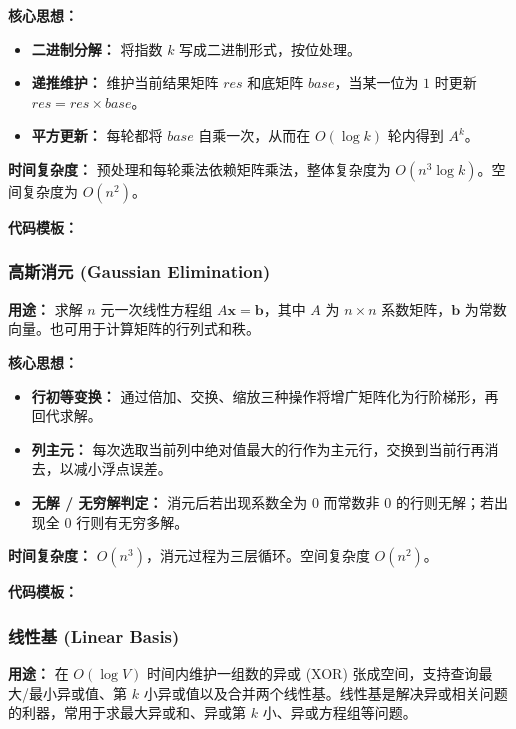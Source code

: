 \textbf{核心思想：}
\begin{itemize}
    \item \textbf{二进制分解：} 将指数 $k$ 写成二进制形式，按位处理。
    \item \textbf{递推维护：} 维护当前结果矩阵 $res$ 和底矩阵 $base$，当某一位为 $1$ 时更新 $res = res \times base$。
    \item \textbf{平方更新：} 每轮都将 $base$ 自乘一次，从而在 $O(\log k)$ 轮内得到 $A^k$。
\end{itemize}

\textbf{时间复杂度：} 预处理和每轮乘法依赖矩阵乘法，整体复杂度为 $O(n^3 \log k)$。空间复杂度为 $O(n^2)$。

\textbf{代码模板：}



\subsubsection{高斯消元 (Gaussian Elimination)}

\textbf{用途：}
求解 $n$ 元一次线性方程组 $A \boldsymbol{x} = \boldsymbol{b}$，其中 $A$ 为 $n \times n$ 系数矩阵，$\boldsymbol{b}$ 为常数向量。也可用于计算矩阵的行列式和秩。

\textbf{核心思想：}
\begin{itemize}
    \item \textbf{行初等变换：} 通过倍加、交换、缩放三种操作将增广矩阵化为行阶梯形，再回代求解。
    \item \textbf{列主元：} 每次选取当前列中绝对值最大的行作为主元行，交换到当前行再消去，以减小浮点误差。
    \item \textbf{无解 / 无穷解判定：} 消元后若出现系数全为 $0$ 而常数非 $0$ 的行则无解；若出现全 $0$ 行则有无穷多解。
\end{itemize}

\textbf{时间复杂度：} $O(n^3)$，消元过程为三层循环。空间复杂度 $O(n^2)$。

\textbf{代码模板：}



\subsubsection{线性基 (Linear Basis)}

\textbf{用途：}
在 $O(\log V)$ 时间内维护一组数的异或 (XOR) 张成空间，支持查询最大/最小异或值、第 $k$ 小异或值以及合并两个线性基。线性基是解决异或相关问题的利器，常用于求最大异或和、异或第 $k$ 小、异或方程组等问题。


